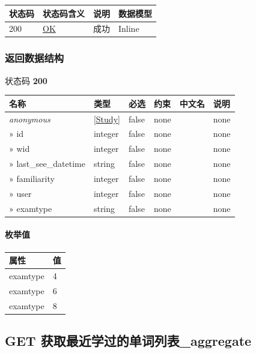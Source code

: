 \documentclass[
]{article}
\begin{document}
\begin{longtable}[]{@{}llll@{}}
\toprule
状态码 & 状态码含义 & 说明 & 数据模型 \\
\midrule
\endhead
200 & \href{https://tools.ietf.org/html/rfc7231\#section-6.3.1}{OK} &
成功 & Inline \\
\bottomrule
\end{longtable}

\hypertarget{ux8fd4ux56deux6570ux636eux7ed3ux6784-37}{%
\subsubsection{返回数据结构}\label{ux8fd4ux56deux6570ux636eux7ed3ux6784-37}}

状态码 \textbf{200}

\begin{longtable}[]{@{}llllll@{}}
\toprule
名称 & 类型 & 必选 & 约束 & 中文名 & 说明 \\
\midrule
\endhead
\emph{anonymous} & {[}\protect\hyperlink{schemastudy}{Study}{]} & false
& none & & none \\
» id & integer & false & none & & none \\
» wid & integer & false & none & & none \\
» last\_see\_datetime & string & false & none & & none \\
» familiarity & integer & false & none & & none \\
» user & integer & false & none & & none \\
» examtype & string & false & none & & none \\
\bottomrule
\end{longtable}

\hypertarget{ux679aux4e3eux503c-7}{%
\paragraph{枚举值}\label{ux679aux4e3eux503c-7}}

\begin{longtable}[]{@{}ll@{}}
\toprule
属性 & 值 \\
\midrule
\endhead
examtype & 4 \\
examtype & 6 \\
examtype & 8 \\
\bottomrule
\end{longtable}

\hypertarget{get-ux83b7ux53d6ux6700ux8fd1ux5b66ux8fc7ux7684ux5355ux8bcdux5217ux8868aggregate}{%
\subsection{GET
获取最近学过的单词列表\_aggregate}\label{get-ux83b7ux53d6ux6700ux8fd1ux5b66ux8fc7ux7684ux5355ux8bcdux5217ux8868aggregate}}
\end{document}
